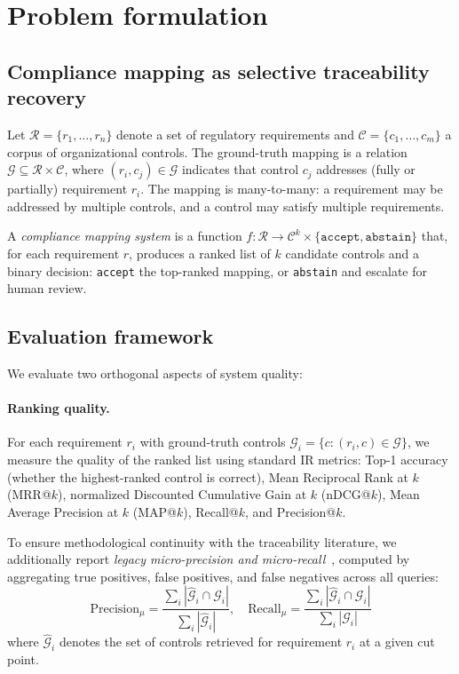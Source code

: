 \documentclass[a4paper,fleqn]{cas-sc}
\begin{document}
\section{Problem formulation}
\label{sec:formulation}

\subsection{Compliance mapping as selective traceability recovery}

Let $\mathcal{R} = \{r_1, \ldots, r_n\}$ denote a set of regulatory requirements and $\mathcal{C} = \{c_1, \ldots, c_m\}$ a corpus of organizational controls.
The ground-truth mapping is a relation $\mathcal{G} \subseteq \mathcal{R} \times \mathcal{C}$, where $(r_i, c_j) \in \mathcal{G}$ indicates that control $c_j$ addresses (fully or partially) requirement $r_i$.
The mapping is many-to-many: a requirement may be addressed by multiple controls, and a control may satisfy multiple requirements.

A \emph{compliance mapping system} is a function $f: \mathcal{R} \rightarrow \mathcal{C}^k \times \{\texttt{accept}, \texttt{abstain}\}$ that, for each requirement $r$, produces a ranked list of $k$ candidate controls and a binary decision: \texttt{accept} the top-ranked mapping, or \texttt{abstain} and escalate for human review.

\subsection{Evaluation framework}
\label{sec:metrics}

We evaluate two orthogonal aspects of system quality:

\paragraph{Ranking quality.}
For each requirement $r_i$ with ground-truth controls $\mathcal{G}_i = \{c : (r_i, c) \in \mathcal{G}\}$, we measure the quality of the ranked list using standard IR metrics: Top-1 accuracy (whether the highest-ranked control is correct), Mean Reciprocal Rank at $k$ (MRR@$k$), normalized Discounted Cumulative Gain at $k$ (nDCG@$k$), Mean Average Precision at $k$ (MAP@$k$), Recall@$k$, and Precision@$k$.

To ensure methodological continuity with the traceability literature, we additionally report \emph{legacy micro-precision and micro-recall}~\citep{MarcusMaletic2003}, computed by aggregating true positives, false positives, and false negatives across all queries:
\begin{equation}
\text{Precision}_\mu = \frac{\sum_i |\hat{\mathcal{G}}_i \cap \mathcal{G}_i|}{\sum_i |\hat{\mathcal{G}}_i|}, \quad
\text{Recall}_\mu = \frac{\sum_i |\hat{\mathcal{G}}_i \cap \mathcal{G}_i|}{\sum_i |\mathcal{G}_i|}
\end{equation}
where $\hat{\mathcal{G}}_i$ denotes the set of controls retrieved for requirement $r_i$ at a given cut point.
\end{document}
